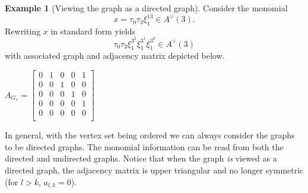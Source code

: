 \documentclass{amsart}
\theoremstyle{definition}
\newtheorem{example}[theorem]{Example}
\theoremstyle{plain}
\numberwithin{theorem}{section}
\numberwithin{equation}{section}
\numberwithin{figure}{section}
\newcommand{\0}{\langle 0 \rangle }
\begin{document}
\begin{example}[Viewing the graph as a directed graph]
    Consider the monomial 
    \[
    x = \tau_0 \tau_3 \xi_1^{13} \in A^\vee(3).
    \]
    Rewriting $x$ in standard form yields
   $$\tau_0 \tau_3 \xi_1^{3^2}\xi_1^{3^1}\xi_1^{3^0}  \in A^\vee(3)$$
   with associated graph and adjacency matrix depicted below. 
   \begin{center}
        \begin{minipage}[c]{.55\textwidth}
        \end{minipage}
        \hspace{1cm}
        \begin{minipage}[c]{.3\textwidth}
            $A_{G_x}=\begin{bmatrix}
                0 & 1 & 0 & 0 & 1 \\
                0 & 0 & 1 & 0 & 0 \\
                0 & 0 & 0 & 1 & 0 \\
                0 & 0 & 0 & 0 & 1 \\
                0 & 0 & 0 & 0 & 0 \\
            \end{bmatrix}$
        \end{minipage}
    \end{center}
    In general, with the vertex set being ordered we can always consider the graphs to be directed graphs. The monomial information can be read from both the directed and undirected graphs. Notice that when the graph \textit{is} viewed as a directed graph, the adjacency matrix is upper triangular and no longer symmetric (for $l>k$, $a_{l,k}=0$). 
\end{example}
\end{document}
